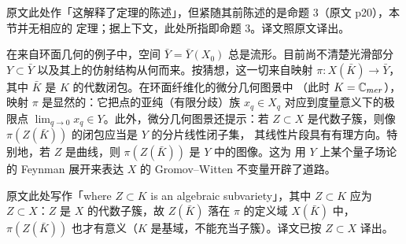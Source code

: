 \begin{yizhu}[「定理」应为命题 3]
原文此处作「这解释了定理的陈述」，但紧随其前陈述的是命题 3（原文 p20），本节并无相应的
定理；据上下文，此处所指即命题 3。译文照原文译出。
\end{yizhu}

在来自环面几何的例子中，空间 $\bar Y=\bar Y(X_0)$ 总是流形。目前尚不清楚光滑部分
$Y\subset\bar Y$ 以及其上的仿射结构从何而来。按猜想，这一切来自映射
$\pi:X(\bar K)\to\bar Y$，其中 $\bar K$ 是 $K$ 的代数闭包。在环面纤维化的微分几何图景中
（此时 $K=\mathbb{C}_{mer}$），映射 $\pi$ 是显然的：它把点的亚纯（有限分歧）族 $x_q\in X_q$
对应到度量意义下的极限点 $\lim_{q\to0}x_q\in Y$。此外，微分几何图景还提示：若
$Z\subset X$ 是代数子簇，则像 $\pi(Z(\bar K))$ 的闭包应当是 $Y$ 的分片线性闭子集，
其线性片段具有有理方向。特别地，若 $Z$ 是曲线，则 $\pi(Z(\bar K))$ 是 $Y$ 中的图像。这为
用 $Y$ 上某个量子场论的 Feynman 展开来表达 $X$ 的 Gromov--Witten 不变量开辟了道路。

\begin{yizhu}[原文的一处笔误]
原文此处写作「where $Z\subset K$ is an algebraic subvariety」，其中 $Z\subset K$ 应为
$Z\subset X$：$Z$ 是 $X$ 的代数子簇，故 $Z(\bar K)$ 落在 $\pi$ 的定义域 $X(\bar K)$ 中，
$\pi(Z(\bar K))$ 也才有意义（$K$ 是基域，不能充当子簇）。译文已按 $Z\subset X$ 译出。
\end{yizhu}


